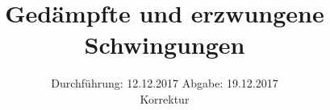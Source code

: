 

\subject{354}
\title{Gedämpfte und erzwungene Schwingungen}
\date{%
  Durchführung: 12.12.2017
  \hspace{3em}
  Abgabe: 19.12.2017  \\
  Korrektur
}



\maketitle
\thispagestyle{empty}
\tableofcontents
\newpage






\printbibliography{}


